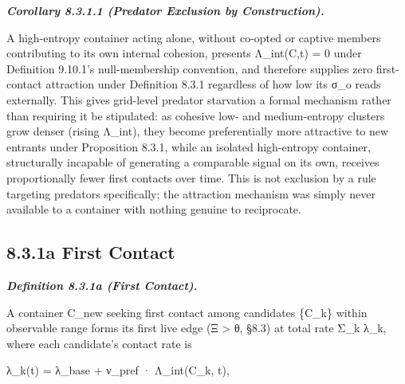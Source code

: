 \documentclass[
]{article}
\begin{document}
\emph{\textbf{Corollary 8.3.1.1 (Predator Exclusion by Construction).}}

A high-entropy container acting alone, without co-opted or captive
members contributing to its own internal cohesion, presents Λ\_int(C,t)
= 0 under Definition 9.10.1's null-membership convention, and therefore
supplies zero first-contact attraction under Definition 8.3.1 regardless
of how low its σ\_o reads externally. This gives grid-level predator
starvation a formal mechanism rather than requiring it be stipulated: as
cohesive low- and medium-entropy clusters grow denser (rising Λ\_int),
they become preferentially more attractive to new entrants under
Proposition 8.3.1, while an isolated high-entropy container,
structurally incapable of generating a comparable signal on its own,
receives proportionally fewer first contacts over time. This is not
exclusion by a rule targeting predators specifically; the attraction
mechanism was simply never available to a container with nothing genuine
to reciprocate.

\hypertarget{a-first-contact}{%
\subsection{8.3.1a First Contact}\label{a-first-contact}}

\emph{\textbf{Definition 8.3.1a (First Contact).}}

A container C\_new seeking first contact among candidates \{C\_k\}
within observable range forms its first live edge (Ξ \textgreater{} θ,
§8.3) at total rate Σ\_k λ\_k, where each candidate's contact rate is

λ\_k(t) = λ\_base + ν\_pref · Λ\_int(C\_k, t),
\end{document}
